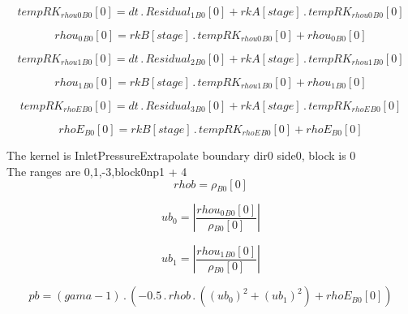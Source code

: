 \documentclass{article}
\begin{document}
\begin{dmath}{tempRK_{rhou0}{_{B0}}}[{0}] = dt \,.\, {Residual_{1}{_{B0}}}[{0}] + {rkA}[{stage}] \,.\, {tempRK_{rhou0}{_{B0}}}[{0}]\end{dmath}

\begin{dmath}{rhou_{0}{_{B0}}}[{0}] = {rkB}[{stage}] \,.\, {tempRK_{rhou0}{_{B0}}}[{0}] + {rhou_{0}{_{B0}}}[{0}]\end{dmath}

\begin{dmath}{tempRK_{rhou1}{_{B0}}}[{0}] = dt \,.\, {Residual_{2}{_{B0}}}[{0}] + {rkA}[{stage}] \,.\, {tempRK_{rhou1}{_{B0}}}[{0}]\end{dmath}

\begin{dmath}{rhou_{1}{_{B0}}}[{0}] = {rkB}[{stage}] \,.\, {tempRK_{rhou1}{_{B0}}}[{0}] + {rhou_{1}{_{B0}}}[{0}]\end{dmath}

\begin{dmath}{tempRK_{rhoE}{_{B0}}}[{0}] = dt \,.\, {Residual_{3}{_{B0}}}[{0}] + {rkA}[{stage}] \,.\, {tempRK_{rhoE}{_{B0}}}[{0}]\end{dmath}

\begin{dmath}{rhoE{_{B0}}}[{0}] = {rkB}[{stage}] \,.\, {tempRK_{rhoE}{_{B0}}}[{0}] + {rhoE{_{B0}}}[{0}]\end{dmath}

\noindent The kernel is InletPressureExtrapolate boundary dir0 side0, block is 0\\\noindent The ranges are 0,1,-3,block0np1 + 4\\\begin{dmath}rhob = {\rho{_{B0}}}[{0}]\end{dmath}

\begin{dmath}ub_{0} = \left|{\frac{{rhou_{0}{_{B0}}}[{0}]}{{\rho{_{B0}}}[{0}]}}\right|\end{dmath}

\begin{dmath}ub_{1} = \left|{\frac{{rhou_{1}{_{B0}}}[{0}]}{{\rho{_{B0}}}[{0}]}}\right|\end{dmath}

\begin{dmath}pb = \left(gama - 1\right) \,.\, \left(- 0.5 \,.\, rhob \,.\, \left(\left(ub_{0} \right)^{2} + \left(ub_{1} \right)^{2}\right) + {rhoE{_{B0}}}[{0}]\right)\end{dmath}
\end{document}

